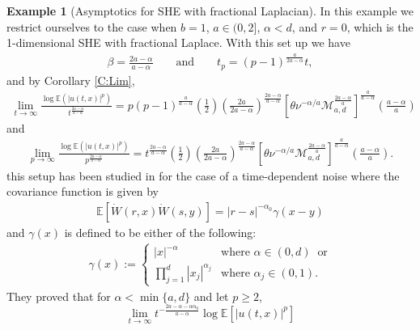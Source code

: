 \documentclass[a4paper,11pt]{article}
\numberwithin{equation}{section}
\numberwithin{equation}{section}
\theoremstyle{plain}
\theoremstyle{definition}
\newtheorem{example}[theorem]{Example}
\newcommand{\E}{\mathbb{E}}
\begin{document}
\begin{example}[Asymptotics for SHE with fractional Laplacian] \label{Eg:AsymStable}
  In this example we restrict ourselves to the case when $b=1$, $a\in (0,2]$, $\alpha < d$, and
  $r=0$, which is the 1-dimensional SHE with fractional Laplace. With this set up we have
  \begin{align*}
    \beta = \frac{2a-\alpha}{a-\alpha} \qquad \text{and} \qquad t_p = (p-1)^{\frac{a}{2a-\alpha}} t,
  \end{align*}
  and by Corollary \ref{C:Lim},
  \begin{align} \label{E:AsymStable-t}
    \lim_{t \to \infty} \frac{\log \E\left(|u(t,x)|^p\right)}{t^{\frac{2a-\alpha}{a-\alpha} }} =
    p (p-1)^{\frac{a}{a-\alpha}} \left( \frac{1}{2} \right)\left( \frac{2a}{2a-\alpha} \right)^{\frac{2a-\alpha}{a-\alpha}}
    \left[ \theta \nu^{-\alpha/a} \mathcal{M}_{a,d}^{\frac{2a-\alpha}{a}} \right]^{ \frac{a}{a-\alpha} } \left(\frac{a-\alpha}{a}\right)
  \end{align}
  and
  \begin{align} \label{E:AsymStable-p}
    \lim_{p \to \infty} \frac{\log \E\left(|u(t,x)|^p\right)}{p^{\frac{2a-\alpha}{a-\alpha} }} =
    t^{\frac{2a-\alpha}{a-\alpha}}
    \left( \frac{1}{2} \right)\left( \frac{2a}{2a-\alpha} \right)^{\frac{2a-\alpha}{a-\alpha}}
    \left[ \theta \nu^{-\alpha/a} \mathcal{M}_{a,d}^{\frac{2a-\alpha}{a}} \right]^{ \frac{a}{a-\alpha} } \left(\frac{a-\alpha}{a}\right).
  \end{align}
  this setup has been studied in \cite{CHSS18} for the case of a time-dependent noise where the
  covariance function is given by
  \begin{align*}
    \mathbb{E}[\dot{W}(r,x)\dot{W}(s,y)] = |r-s|^{-\alpha_0}\gamma(x-y)
  \end{align*}
  and $\gamma(x)$ is defined to be either of the following:
  \begin{align} \label{E:gammaHu}
    \gamma(x) := \begin{cases}
                  |x|^{-\alpha}                  & \text{where } \alpha \in (0,d)\: \text{ or} \\
                  \prod_{j=1}^d |x_j|^{\alpha_j} & \text{where } \alpha_j \in (0,1).
                  \end{cases}
  \end{align}
  They proved that for $\alpha < \min\{a,d\}$ and let $p \ge 2$,
  \begin{equation}\label{E:AsymVar}
    \lim_{t\to\infty} t^{-\frac{2a - \alpha - \alpha\alpha_0}{a-\alpha}}\log\mathbb{E}[|u(t,x)|^p]

\end{equation}
\end{example}
\end{document}
